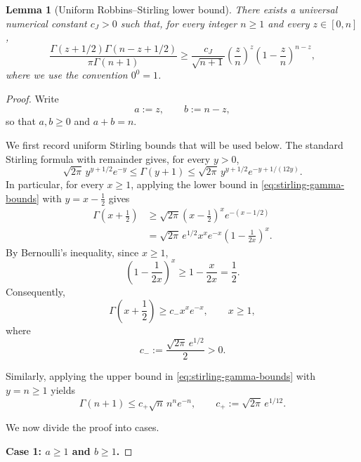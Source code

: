 \documentclass[12pt]{article}
\theoremstyle{spaced}
\newtheorem{lemma}[lemma]{Lemma}
\theoremstyle{remark}
\begin{document}
\begin{lemma}[Uniform Robbins--Stirling lower bound]
\label{lem:uniform-robbins-stirling}
There exists a universal numerical constant \(c_J>0\) such that, for every
integer \(n\ge 1\) and every \(z\in[0,n]\),
\begin{equation}
\label{eq:uniform-robbins-stirling}
\frac{
    \Gamma(z+1/2)\Gamma(n-z+1/2)
}{
    \pi\Gamma(n+1)
}
\ge
\frac{c_J}{\sqrt{n+1}}
\left(\frac zn\right)^z
\left(1-\frac zn\right)^{n-z},
\end{equation}
where we use the convention \(0^0=1\).
\end{lemma}

\begin{proof}
Write
\[
    a:=z,
    \qquad
    b:=n-z,
\]
so that \(a,b\ge 0\) and \(a+b=n\).

We first record uniform Stirling bounds that will be used below. The standard
Stirling formula with remainder gives, for every \(y>0\),
\begin{equation}
\label{eq:stirling-gamma-bounds}
\sqrt{2\pi}\,
y^{y+1/2}e^{-y}
\le
\Gamma(y+1)
\le
\sqrt{2\pi}\,
y^{y+1/2}e^{-y+1/(12y)}.
\end{equation}
In particular, for every \(x\ge1\), applying the lower bound in
\eqref{eq:stirling-gamma-bounds} with \(y=x-\frac12\) gives
\begin{align}
\Gamma\left(x+\frac12\right)
&\ge
\sqrt{2\pi}
\left(x-\frac12\right)^x
e^{-(x-1/2)}
\nonumber\\
&=
\sqrt{2\pi}\,e^{1/2}
x^xe^{-x}
\left(1-\frac{1}{2x}\right)^x.
\label{eq:half-gamma-lower-pre}
\end{align}
By Bernoulli's inequality, since \(x\ge1\),
\[
\left(1-\frac{1}{2x}\right)^x
\ge
1-\frac{x}{2x}
=
\frac12.
\]
Consequently,
\begin{equation}
\label{eq:half-gamma-lower}
\Gamma\left(x+\frac12\right)
\ge
c_-x^xe^{-x},
\qquad x\ge1,
\end{equation}
where
\[
    c_-:=\frac{\sqrt{2\pi}\,e^{1/2}}{2}>0.
\]

Similarly, applying the upper bound in
\eqref{eq:stirling-gamma-bounds} with \(y=n\ge1\) yields
\begin{equation}
\label{eq:factorial-upper}
\Gamma(n+1)
\le
c_+\sqrt n\,n^ne^{-n},
\qquad
c_+:=\sqrt{2\pi}\,e^{1/12}.
\end{equation}

We now divide the proof into cases.

\medskip
\noindent
\textbf{Case 1: \(a\ge1\) and \(b\ge1\).}


\end{proof}
\end{document}
